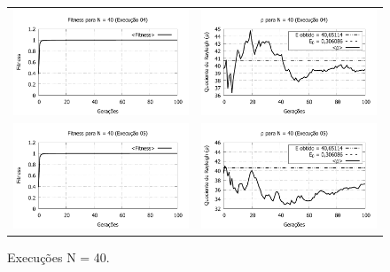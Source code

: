 \begin{figure}[phtb]
\begin{tabular}{@{}cc@{}}
		\includegraphics[width=.40\textwidth]{figs/resultados/fitnessGrad/N40_04_fitness.pdf} &
    \includegraphics[width=.40\textwidth]{figs/resultados/fitnessGrad/N40_04_rho.pdf}   \\
		\includegraphics[width=.40\textwidth]{figs/resultados/fitnessGrad/N40_05_fitness.pdf} &
    \includegraphics[width=.40\textwidth]{figs/resultados/fitnessGrad/N40_05_rho.pdf}
  \end{tabular}
  \caption{Execuções N = 40.}
	\label{fig:execucoes_N40}
\end{figure}

